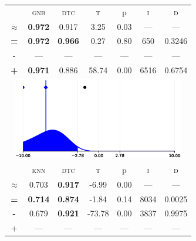 \begin{tabular}{c||cc||c|c|c||c}
\midrule	&\textsc{gnb} & \textsc{dtc} & \textsc{t} & p & \textsc{i} & \textsc{d}\\
	\color{red} $\approx$ & \color{red} \bfseries 0.972 &\color{red}   0.917 & 3.25 & 0.03 & --- & ---\\\midrule
	{\bfseries\color{black}\tiny=}& \color{black} \bfseries 0.972 & \color{black} \bfseries 0.966 & 0.27 & 0.80 & 650 & \color{black} 0.3246\\
	{\tiny-}& --- & --- & --- & --- & --- & ---\\
	{\bfseries\color{red}\tiny+}& \color{red} \bfseries 0.971 & \color{red}  0.886 & 58.74 & 0.00 & 6516 & \color{red} 0.6754\\
	\bottomrule
	\multicolumn{7}{c}{\includegraphics[width=7.5cm, trim=30 0 30 0]{figures/wine_2.eps}}\\

\midrule	&\textsc{knn} & \textsc{dtc} & \textsc{t} & p & \textsc{i} & \textsc{d}\\
	\color{blue} $\approx$ & \color{blue}  0.703 &\color{blue}  \bfseries 0.917 & -6.99 & 0.00 & --- & ---\\\midrule
	{\bfseries\color{black}\tiny=}& \color{black} \bfseries 0.714 & \color{black} \bfseries 0.874 & -1.84 & 0.14 & 8034 & \color{black} 0.0025\\
	{\bfseries\color{blue}\tiny-}& \color{blue}  0.679 & \color{blue} \bfseries 0.921 & -73.78 & 0.00 & 3837 & \color{blue} 0.9975\\
	{\tiny+}& --- & --- & --- & --- & --- & ---\\
\bottomrule\end{tabular}


